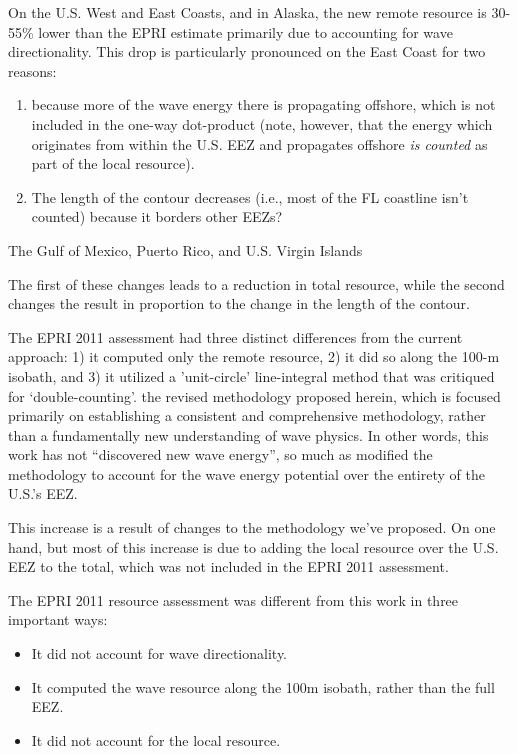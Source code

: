 On the U.S. West and East Coasts, and in Alaska, the new remote resource is 30-55\% lower than the EPRI estimate primarily due to accounting for wave directionality. This drop is particularly pronounced on the East Coast for two reasons:
\begin{enumerate}
\item because more of the wave energy there is propagating offshore, which is not included in the one-way dot-product (note, however, that the energy which originates from within the U.S. EEZ and propagates offshore {\em is counted} as part of the local resource). 
\item The length of the contour decreases (i.e., most of the FL coastline isn't counted) because it borders other EEZs? 
\end{enumerate}
The Gulf of Mexico, Puerto Rico, and U.S. Virgin Islands 

 The first of these changes leads to a reduction in total resource, while the second changes the result in proportion to the change in the length of the contour.

The EPRI 2011 assessment had three distinct differences from the current approach: 1) it computed only the remote resource, 2) it did so along the 100-m isobath, and 3) it utilized a 'unit-circle' line-integral method that was critiqued for `double-counting'. 
the revised methodology proposed herein, which is focused primarily on establishing a consistent and comprehensive methodology, rather than a fundamentally new understanding of wave physics. In other words, this work has not ``discovered new wave energy'', so much as modified the methodology to account for the wave energy potential over the entirety of the U.S.'s EEZ.

This increase is a result of changes to the methodology we've proposed. On one hand, 
but most of this increase is due to adding the local resource over the U.S. EEZ to the total, which was not included in the EPRI 2011 assessment. 


The EPRI 2011 resource assessment was different from this work in three important ways:
\begin{itemize}
\item It did not account for wave directionality.
\item It computed the wave resource along the 100m isobath, rather than the full EEZ.
\item It did not account for the local resource.
\end{itemize}


